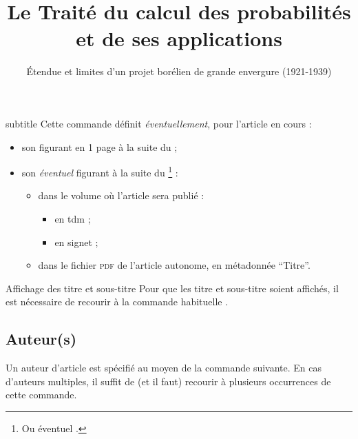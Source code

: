 \documentclass[french,nolocaltoc]{nwejmart}
\newtheorem[title=Fait,style=definition]{fact}
\begin{document}
\begin{docCommand}{subtitle}{}
  Cette commande définit \emph{éventuellement}, pour l'article en cours :
  \begin{itemize}
  \item son  figurant en 1\iere{} page à la suite
    du  ;
  \item son \emph{éventuel}  figurant à la suite du
    \footnote{Ou éventuel .} :
    \begin{itemize}
    \item dans le volume où l'article sera publié :
      \begin{itemize}
      \item en \gls{tdm} ;
      \item en signet ;
      \end{itemize}
    \item dans le fichier \textsc{pdf} de l'article autonome, en métadonnée
      \enquote{Titre}.
    \end{itemize}
  \end{itemize}
\end{docCommand}

\begin{bodycode}
\title[Le Traité du calcul des probabilités]{Le Traité du calcul des
  probabilités et de ses applications}
\subtitle[Étendue et limites d'un projet borélien]{Étendue et limites
  d'un projet borélien de grande envergure (1921-1939)}
\end{bodycode}

\begin{dbremark}{Affichage des titre et sous-titre}{}
  Pour que les titre et sous-titre soient affichés, il est nécessaire de
  recourir à la commande habituelle .
\end{dbremark}

\subsection{Auteur(s)}
\label{sec-auteurs}

Un auteur d'article est spécifié au moyen de la commande 
suivante. En cas d'auteurs multiples, il suffit de (et il faut) recourir
à plusieurs occurrences de cette commande.
\end{document}
